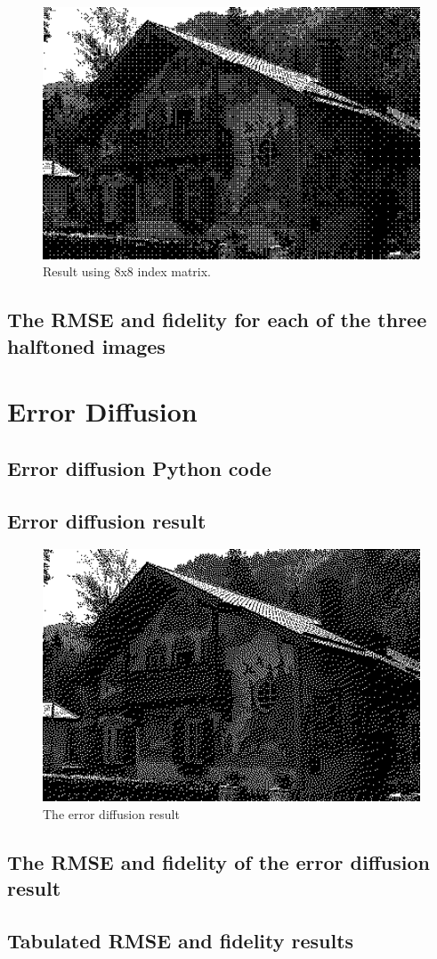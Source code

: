\documentclass{article}
\begin{document}
\begin{figure}[H]
    \centering
    \includegraphics[width=1\textwidth]{../4-b8x8.png}
    \caption{Result using 8x8 index matrix.}
\end{figure}
\subsection{The RMSE and fidelity for each of the three halftoned images}

\section{Error Diffusion}
\subsection{Error diffusion Python code}

\subsection{Error diffusion result}
\begin{figure}[H]
    \centering
    \includegraphics[width=1\textwidth]{../5-diffusion-result.png}
    \caption{The error diffusion result}
\end{figure}
\subsection{The RMSE and fidelity of the error diffusion result}
\subsection{Tabulated RMSE and fidelity results}
\end{document}
